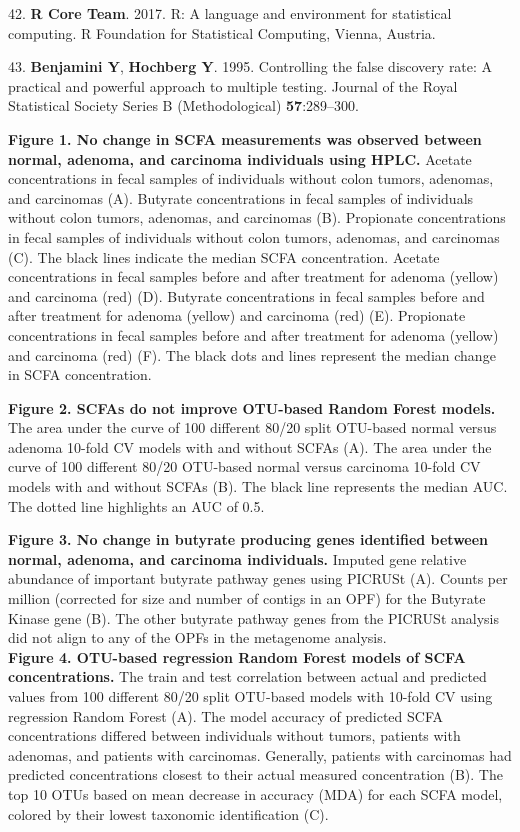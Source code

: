 \documentclass[11pt,]{article}
\begin{document}
\hypertarget{ref-r_citation_2017}{}
42. \textbf{R Core Team}. 2017. R: A language and environment for
statistical computing. R Foundation for Statistical Computing, Vienna,
Austria.

\hypertarget{ref-benjamini_controlling_1995}{}
43. \textbf{Benjamini Y}, \textbf{Hochberg Y}. 1995. Controlling the
false discovery rate: A practical and powerful approach to multiple
testing. Journal of the Royal Statistical Society Series B
(Methodological) \textbf{57}:289--300.

\newpage

\textbf{Figure 1. No change in SCFA measurements was observed between
normal, adenoma, and carcinoma individuals using HPLC.} Acetate
concentrations in fecal samples of individuals without colon tumors,
adenomas, and carcinomas (A). Butyrate concentrations in fecal samples
of individuals without colon tumors, adenomas, and carcinomas (B).
Propionate concentrations in fecal samples of individuals without colon
tumors, adenomas, and carcinomas (C). The black lines indicate the
median SCFA concentration. Acetate concentrations in fecal samples
before and after treatment for adenoma (yellow) and carcinoma (red) (D).
Butyrate concentrations in fecal samples before and after treatment for
adenoma (yellow) and carcinoma (red) (E). Propionate concentrations in
fecal samples before and after treatment for adenoma (yellow) and
carcinoma (red) (F). The black dots and lines represent the median
change in SCFA concentration.

\textbf{Figure 2. SCFAs do not improve OTU-based Random Forest models.}
The area under the curve of 100 different 80/20 split OTU-based normal
versus adenoma 10-fold CV models with and without SCFAs (A). The area
under the curve of 100 different 80/20 OTU-based normal versus carcinoma
10-fold CV models with and without SCFAs (B). The black line represents
the median AUC. The dotted line highlights an AUC of 0.5.

\textbf{Figure 3. No change in butyrate producing genes identified
between normal, adenoma, and carcinoma individuals.} Imputed gene
relative abundance of important butyrate pathway genes using PICRUSt
(A). Counts per million (corrected for size and number of contigs in an
OPF) for the Butyrate Kinase gene (B). The other butyrate pathway genes
from the PICRUSt analysis did not align to any of the OPFs in the
metagenome analysis.\\
\textbf{Figure 4. OTU-based regression Random Forest models of SCFA
concentrations.} The train and test correlation between actual and
predicted values from 100 different 80/20 split OTU-based models with
10-fold CV using regression Random Forest (A). The model accuracy of
predicted SCFA concentrations differed between individuals without
tumors, patients with adenomas, and patients with carcinomas. Generally,
patients with carcinomas had predicted concentrations closest to their
actual measured concentration (B). The top 10 OTUs based on mean
decrease in accuracy (MDA) for each SCFA model, colored by their lowest
taxonomic identification (C).
\end{document}

